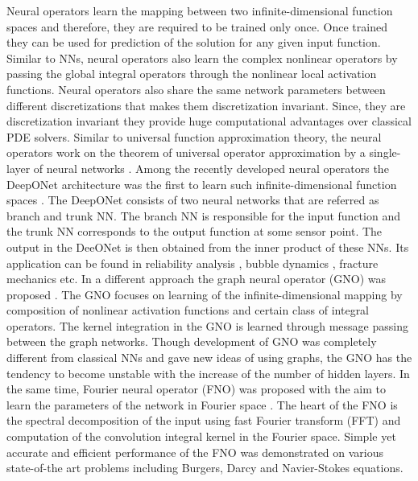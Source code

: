 \documentclass{article}
\begin{document}
Neural operators learn the mapping between two infinite-dimensional function spaces and therefore, they are required to be trained only once. Once trained they can be used for prediction of the solution for any given input function. Similar to NNs, neural operators also learn the complex nonlinear operators by passing the global integral operators through the nonlinear local activation functions. Neural operators also share the same network parameters between different discretizations that makes them discretization invariant. Since, they are discretization invariant they provide huge computational advantages over classical PDE solvers. Similar to universal function approximation theory, the neural operators work on the theorem of universal operator approximation by a single-layer of neural networks \cite{chen1995universal}. 
Among the recently developed neural operators the DeepONet architecture was the first to learn such infinite-dimensional function spaces \cite{lu2019deeponet,lu2022comprehensive}. The DeepONet consists of two neural networks that are referred as branch and trunk NN. The branch NN is responsible for the input function and the trunk NN corresponds to the output function at some sensor point. The output in the DeeONet is  then obtained from the inner product of these NNs. Its application can be found in reliability analysis \cite{garg2022assessment}, bubble dynamics \cite{lin2021seamless}, fracture mechanics \cite{goswami2022physics} etc. 
In a different approach the graph neural operator (GNO) was proposed \cite{li2020neural}. The GNO focuses on learning of the infinite-dimensional mapping by composition of
nonlinear activation functions and certain class of integral operators. The kernel integration in the GNO is learned through message passing between the graph networks. Though development of GNO was completely different from classical NNs and gave new ideas of using graphs, the GNO has the tendency to become unstable with the increase of the number of hidden layers. In the same time, Fourier neural operator (FNO) was proposed with the aim to learn the parameters of the network in Fourier space \cite{li2020fourier}. The heart of the FNO is the spectral decomposition of the input using fast Fourier transform (FFT) and computation of the convolution integral kernel in the Fourier space. Simple yet accurate and efficient performance of the FNO was demonstrated on various state-of-the art problems including Burgers, Darcy and Navier-Stokes equations. 
\end{document}

